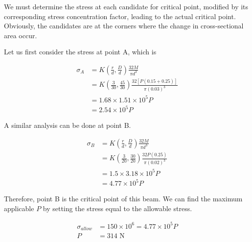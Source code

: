 \documentclass[
10pt,
a4paper,
openany,
svgnames,
]{book}
\begin{document}
\begin{solution}
  We must determine the stress at each candidate for critical point, modified by its corresponding stress concentration factor, leading to the actual critical point. Obviously, the candidates are at the corners where the change in cross-sectional area occur.

  Let us first consider the stress at point A, which is

  \begin{align*}
    \sigma_A &= K(\frac{r}{d}, \frac{D}{d}) \frac{32M}{\pi d^3} \\
             &= K(\frac{3}{30}, \frac{45}{30}) \frac{32[P(0.15 + 0.25)]}{\pi (0.03)^3} \\
             &= 1.68 \times 1.51 \times 10^5 P \\
             &= 2.54 \times 10^5 P
  \end{align*}

  A similar analysis can be done at point B.

  \begin{align*}
    \sigma_B &= K(\frac{r}{d}, \frac{D}{d}) \frac{32M}{\pi d^3} \\
             &= K(\frac{3}{20}, \frac{30}{20}) \frac{32P(0.25)}{\pi (0.02)^3} \\
             &= 1.5 \times 3.18 \times 10^5 P \\
             &= 4.77 \times 10^5 P
  \end{align*}

  Therefore, point B is the critical point of this beam. We can find the maximum applicable $P$ by setting the stress equal to the allowable stress.

  \begin{align*}
    \sigma_{allow} &= 150 \times 10^6 = 4.77 \times 10^5 P \\
    P &= 314 \text{ N}
  \end{align*}
\end{solution}
\end{document}
